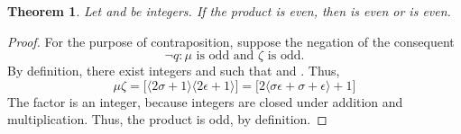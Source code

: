 \documentclass[preview]{standalone}
\newtheorem{theorem}{Theorem}
\begin{document}
\begin{theorem} %
    Let \bm{$\mu$} and \bm{$\zeta$} be integers. 
    If the product \bm{$\mu\zeta$} is even, 
    then \bm{$\mu$} is even or \bm{$\zeta$} is even.
\end{theorem}

\begin{proof}
    For the purpose of contraposition, suppose the negation of the consequent 
        $$\lnot q : \mu \text{ is odd and } \zeta \text{ is odd.}$$ 
    By definition, 
    there exist integers \bm{$\sigma$} and \bm{$\epsilon$} such that 
     and . 
    Thus, 
    \begin{equation*}
        \mu\zeta 
            =
        \Big[ 
            \big \langle 2 \sigma + 1 \big \rangle
            \big \langle 2 \epsilon + 1 \big \rangle 
        \Big]
            =
        \Big[ 
            2 
            \big \langle \sigma\epsilon + \sigma + \epsilon \big \rangle 
                + 
            1
        \Big]
    \end{equation*}
    The factor 
    \bm{$\big \langle \sigma \epsilon \textbf{ + } \sigma \textbf{ + } \epsilon \big \rangle$} 
    is an integer, 
    because integers are closed under addition and multiplication. 
    Thus, the product \bm{$\mu \zeta$} is odd, by definition.
\end{proof}
\end{document}

